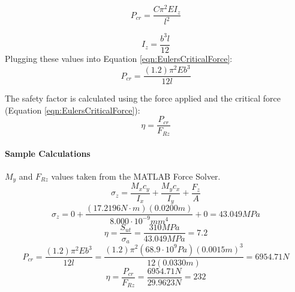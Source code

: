 \documentclass[../main.tex]{subfiles}
\begin{document}
\begin{equation} \label{eqn:EulersCriticalForce}
P_{cr} = \frac{C\pi^2EI_z}{l^2}
\end{equation}

\begin{equation}
I_z = \frac{b^3l}{12}
\end{equation}
Plugging these values into Equation \ref{eqn:EulersCriticalForce}:
\begin{equation}
P_{cr} = \frac{(1.2)\pi^2Eb^3}{12l}
\end{equation}

The safety factor is calculated using the force applied and the critical force (Equation \ref{eqn:EulersCriticalForce}):
\begin{equation}
\eta = \frac{P_{cr}}{F_{Rz}}
\end{equation}

\paragraph*{Sample Calculations}
$M_y$ and $F_{Rz}$ values taken from the MATLAB Force Solver.
$$\sigma_{z}={\frac{M_{x}c_y}{I_x}}+{\frac{M_{y}c_x}{I_y}}+{\frac{F_z}{A}}$$
$$\sigma_{z}=0+\frac{(17.2196N\cdot{}m)(0.0200m)}{8.000\cdot{}10^{-9}mm^4}+0 = 43.049MPa$$
$$\eta = \dfrac{S_{ut}}{\sigma _a} = \dfrac{310MPa}{43.049MPa}=7.2$$
$$P_{cr} = \frac{(1.2)\pi^2Eb^3}{12l}=\frac{(1.2)\pi^2(68.9\cdot{}10^9Pa)(0.0015m)^3}{12(0.0330m)}=6954.71N$$
$$\eta = \frac{P_{cr}}{F_{Rz}} = \frac{6954.71N}{29.9623N} = 232$$
\end{document}
